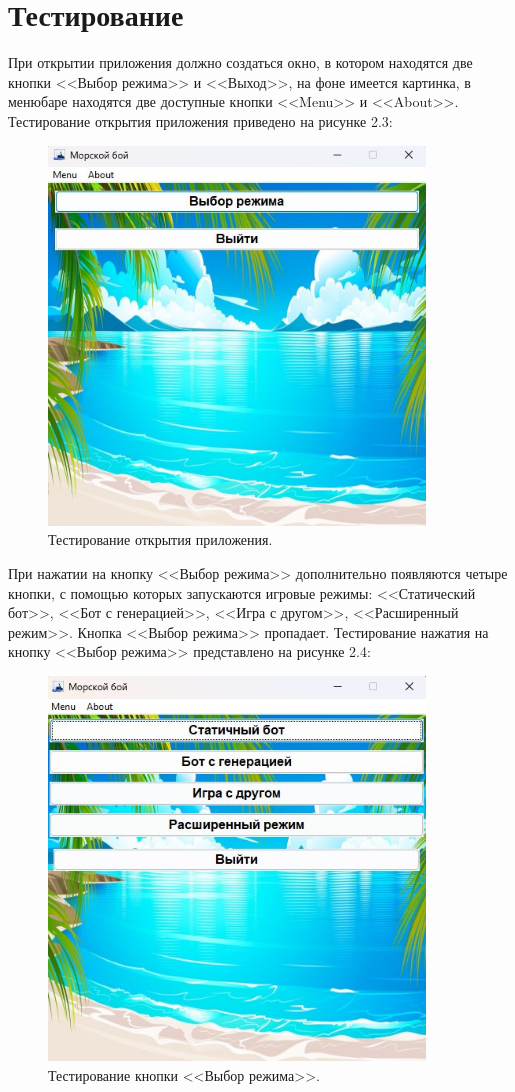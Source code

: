 \section{\label{sec:ch02/sec09}Тестирование}
При открытии приложения должно создаться окно, в котором находятся две кнопки <<Выбор режима>> и <<Выход>>, на фоне имеется картинка, в менюбаре находятся две доступные кнопки <<Menu>> и <<About>>. Тестирование открытия приложения приведено на рисунке 2.3:
\begin{figure}[H]
\graphicspath{ {img/} }
\centering
\includegraphics[width = 10cm]{главное окно.jpg}
\caption{Тестирование открытия приложения.}
\end{figure}
При нажатии на кнопку <<Выбор режима>> дополнительно появляются четыре кнопки, с помощью которых запускаются игровые режимы: <<Статический бот>>, <<Бот с генерацией>>, <<Игра с другом>>, <<Расширенный режим>>. Кнопка <<Выбор режима>> пропадает. Тестирование нажатия на кнопку <<Выбор режима>> представлено на рисунке 2.4:
\begin{figure}[H]
\graphicspath{ {img/} }
\centering
\includegraphics[width = 10cm]{Выбор режима.jpg}
\caption{Тестирование кнопки <<Выбор режима>>.}
\end{figure}
